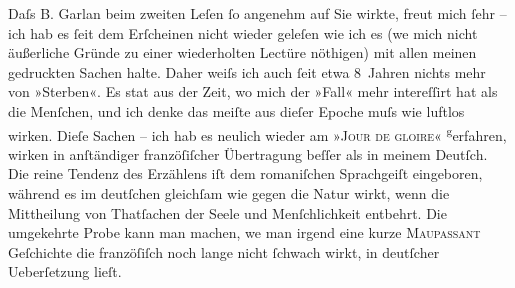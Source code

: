 \pstart
           {\pb}Daſs \introOben{}B.\introOben{} Garlan beim zweiten Leſen{ }ſo angenehm auf Sie
               wirkte, freut mich{ }ſehr – ich hab es{ }ſeit dem Erſcheinen nicht wieder geleſen wie ich
               es (we{\geminationn} mich nicht äußerliche Gründe zu einer
               wiederholten Lectüre nöthigen) mit allen meinen gedruckten Sachen halte. Daher weiſs
               ich auch{ }ſeit etwa 8 Jahren nichts mehr von »Sterben«. Es sta{\geminationm}t aus der Zeit, wo mich der
               »Fall« mehr intereſſirt hat als die Menſchen, und ich denke das meiſte aus dieſer
               Epoche muſs wie luftlos wirken. Dieſe Sachen – ich hab es neulich wieder am »\textsc{Jour de {\pb}gloire}« \substVorne{}\textsuperscript{g}\substDazwischen{}e\substHinten{}rfahren, wirken in anſtändiger franzöſiſcher Übertragung beſſer als in meinem
               Deutſch. Die reine Tendenz des Erzählens iſt dem romaniſchen Sprachgeiſt eingeboren,
               während es im deutſchen gleichſam wie gegen die Natur wirkt, wenn die Mittheilung von
               Thatſachen der Seele und Menſchlichkeit entbehrt. Die umgekehrte Probe kann man
               machen, we{\geminationn} man irgend eine kurze \textsc{Maupassant} Geſchichte die franzöſiſch noch lange nicht{ }ſchwach wirkt, in deutſcher
               Ueberſetzung lieſt.\pend
           
